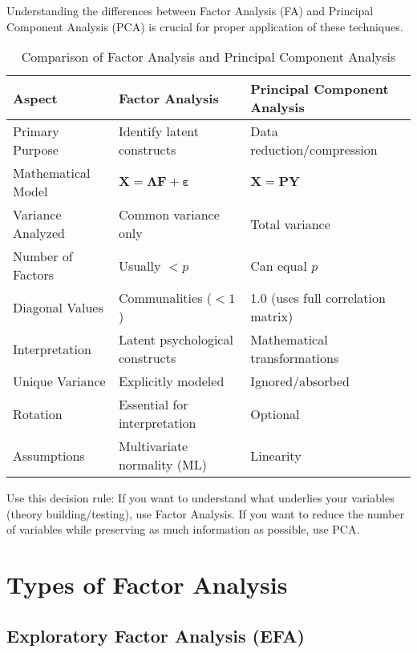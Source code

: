 \documentclass[a4paper]{tufte-book}
\begin{document}
Understanding the differences between Factor Analysis (FA) and Principal Component Analysis (PCA) is crucial for proper application of these techniques.

\begin{table}[h]
\centering
\caption{Comparison of Factor Analysis and Principal Component Analysis}
\begin{tabular}{@{}lll@{}}
\toprule
\textbf{Aspect} & \textbf{Factor Analysis} & \textbf{Principal Component Analysis} \\
\midrule
Primary Purpose & Identify latent constructs & Data reduction/compression \\
Mathematical Model & $\mathbf{X} = \boldsymbol{\Lambda}\mathbf{F} + \boldsymbol{\varepsilon}$ & $\mathbf{X} = \mathbf{P}\mathbf{Y}$ \\
Variance Analyzed & Common variance only & Total variance \\
Number of Factors & Usually $< p$ & Can equal $p$ \\
Diagonal Values & Communalities ($< 1$) & 1.0 (uses full correlation matrix) \\
Interpretation & Latent psychological constructs & Mathematical transformations \\
Unique Variance & Explicitly modeled & Ignored/absorbed \\
Rotation & Essential for interpretation & Optional \\
Assumptions & Multivariate normality (ML) & Linearity \\
\bottomrule
\end{tabular}
\end{table}

\begin{learningtip}
Use this decision rule: If you want to understand what underlies your variables (theory building/testing), use Factor Analysis. If you want to reduce the number of variables while preserving as much information as possible, use PCA.
\end{learningtip}

\section{Types of Factor Analysis}

\subsection{Exploratory Factor Analysis (EFA)}
\end{document}
